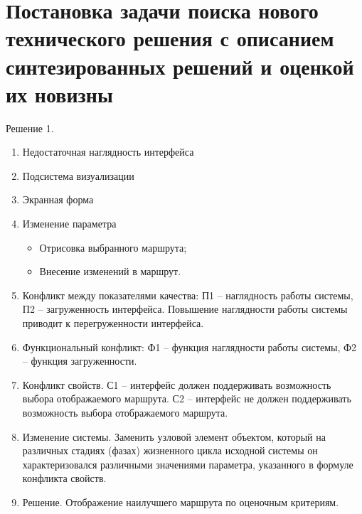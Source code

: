 \chapter{Постановка задачи поиска нового технического решения с описанием синтезированных решений и 
    оценкой их новизны}
Решение 1.
\begin{enumerate}
    \item Недостаточная наглядность интерфейса
    \item Подсистема визуализации
    \item Экранная форма
    \item Изменение параметра
    \begin{itemize}
        \item Отрисовка выбранного маршрута;
        \item Внесение изменений в маршрут.
    \end{itemize}
    \item Конфликт между показателями качества: П1 -- наглядность работы системы, 
        П2 -- загруженность интерфейса. Повышение наглядности работы системы приводит к 
        перегруженности интерфейса.
    \item Функциональный конфликт: Ф1 -- функция наглядности работы системы, Ф2 -- 
        функция загруженности.
    \item Конфликт свойств. С1 -- интерфейс должен поддерживать возможность выбора отображаемого 
        маршрута. С2 -- интерфейс не должен поддерживать возможность выбора отображаемого маршрута.
    \item Изменение системы. Заменить узловой элемент объектом, который на различных стадиях (фазах) 
        жизненного цикла исходной системы он характеризовался различными значениями параметра, 
        указанного в формуле конфликта свойств.
    \item Решение. Отображение наилучшего маршрута по оценочным критериям.
\end{enumerate}

\pagebreak

